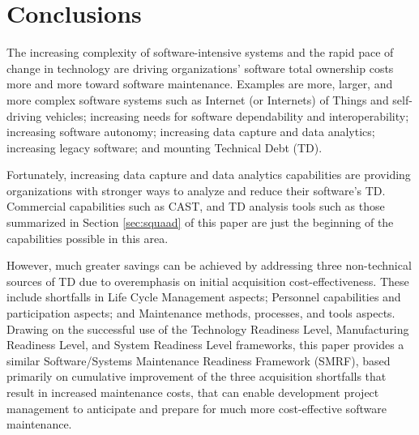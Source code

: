 \section{Conclusions}
\label{sec:conclusion}
The increasing complexity of software-intensive systems and the rapid pace of change in technology are driving organizations' software total ownership costs more and more toward software maintenance. Examples are more, larger, and more complex software systems such as Internet (or Internets) of Things and self-driving vehicles; increasing needs for software dependability and interoperability; increasing software autonomy; increasing data capture and data analytics; increasing legacy software; and mounting Technical Debt (TD).

Fortunately, increasing data capture and data analytics capabilities are  providing organizations with stronger ways to analyze and reduce their software's TD. Commercial capabilities such as CAST, and TD analysis tools such as those summarized in Section \ref{sec:squaad} of this paper are just the beginning of the capabilities possible in this area.

However, much greater savings can be achieved by addressing three non-technical sources of TD due to overemphasis  on initial acquisition cost-effectiveness. These include shortfalls  in Life Cycle Management aspects; Personnel capabilities and participation aspects; and Maintenance methods, processes, and tools aspects. Drawing on the successful use of the Technology Readiness Level, Manufacturing Readiness Level, and System Readiness Level frameworks, this paper provides a similar Software/Systems Maintenance Readiness Framework (SMRF), based primarily on cumulative improvement of the three acquisition shortfalls that result in increased maintenance costs, that can enable development project management to anticipate and prepare for much more cost-effective software maintenance.